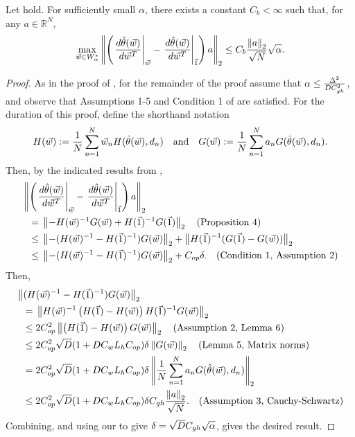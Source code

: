 \begin{lem}
%
Let  hold. For sufficiently small $\alpha$,
there exists a constant $C_b < \infty$ such that, for any $a \in \mathbb{R}^N$,
%
\begin{align*}
%
\max_{\w \in W_\alpha^*}
\vnorm{\left(
    \fracat{d \thetahat(\w)}{ d\w^T}{\w} -
    \fracat{d \thetahat(\w)}{ d\w^T}{\onevec}
    \right) a }_2
\le C_b \frac{\vnorm{a}_2}{\sqrt{N}} \sqrt{\alpha}.
%
\end{align*}
%
\begin{proof}
%
As in the proof of , for the remainder of the proof
assume that $\alpha \le \frac{\Delta^2}{DC_{gh}^2}$, and observe that Assumptions
1-5 and Condition 1 of \citet{giordano:2019:swiss} are satisfied.
%
For the duration of this proof, define the shorthand notation
%
\begin{align*}
%
H(\w) := \meann \w_n H(\thetahat(\w), d_n)
\quad\textrm{and}\quad
G(\w) := \meann a_n G(\thetahat(\w), d_n).
%
\end{align*}
%
Then, by the indicated results from \citet{giordano:2019:swiss},
%
\begin{align*}
%
\MoveEqLeft
\vnorm{\left(
    \fracat{d \thetahat(\w)}{ d\w^T}{\w} -
    \fracat{d \thetahat(\w)}{ d\w^T}{\onevec}
    \right) a }_2
\\={}&
\vnorm{-H(\w)^{-1} G(\w) + H(\onevec)^{-1} G(\onevec)}_2
    \quad \textrm{(Proposition 4)}
\\\le{}&
\vnorm{-(H(\w)^{-1} - H(\onevec)^{-1} ) G(\w)}_2 +
\vnorm{ H(\onevec)^{-1} ( G(\onevec) - G(\w))}_2
%
\\\le{}&
\vnorm{-(H(\w)^{-1} - H(\onevec)^{-1} ) G(\w)}_2 + \cop \delta.
    \quad \textrm{(Condition 1, Assumption 2)}
%
\end{align*}
%
Then,
%
\begin{align*}
%
\MoveEqLeft
\vnorm{(H(\w)^{-1} - H(\onevec)^{-1} ) G(\w)}_2
\\={}&
\vnorm{ H(\w)^{-1} \left(H(\onevec) -  H(\w)\right) H(\onevec)^{-1} G(\w)}_2
\\\le{}&
2\cop^2 \vnorm{\left(H(\onevec) -  H(\w)\right) G(\w)}_2
\quad\textrm{(Assumption 2, Lemma 6)}
\\\le{}&
2\cop^2 \sqrt{D} (1 + D C_w L_h \cop) \delta \vnorm{G(\w)}_2
\quad\textrm{(Lemma 5, Matrix norms)}
\\={}&
2\cop^2 \sqrt{D} (1 + D C_w L_h \cop) \delta
     \vnorm{\meann a_n G(\thetahat(\w), d_n)}_2
\\\le{}&
2\cop^2 \sqrt{D} (1 + D C_w L_h \cop) \delta
     \cgh \frac{\vnorm{a}_2}{\sqrt{N}}.
\quad\textrm{(Assumption 3, Cauchy-Schwartz)}
%
\end{align*}
%
Combining, and using our  to give $\delta = \sqrt{D}
C_{gh} \sqrt{\alpha}$, gives the desired result.
%
\end{proof}
%
\end{lem}



